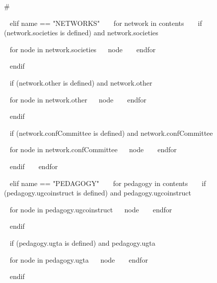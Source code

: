 \begin{minipage}{\textwidth}
{%
#}




~{ elif name == "NETWORKS" }~
~{ for network in contents }~
  ~{ if (network.societies is defined) and network.societies }~
  \begin{entrylist}[.1]
    ~{ for node in network.societies}~
     \networkentry
      {}
      {~{{ node }}~}
    ~{ endfor }~
  \end{entrylist}
  ~{ endif }~

  ~{ if (network.other is defined) and network.other }~
  \begin{entrylist}[.1]
    ~{ for node in network.other}~
     \networkentry
      {}
      {~{{ node }}~}
    ~{ endfor }~
  \end{entrylist}
  ~{ endif }~

  ~{ if (network.confCommittee is defined) and network.confCommittee }~
  \begin{entrylist}[.1]
    ~{ for node in network.confCommittee}~
     \networkentry
      {}
      {~{{ node }}~}
    ~{ endfor }~
  \end{entrylist}
  ~{ endif }~
~{ endfor }~



~{ elif name == "PEDAGOGY" }~
~{ for pedagogy in contents }~
  ~{ if (pedagogy.ugcoinstruct is defined) and pedagogy.ugcoinstruct }~
  \begin{entrylist}[.1]
    ~{ for node in pedagogy.ugcoinstruct}~
     \pedentry
      {~{{ node }}~}
    ~{ endfor }~
  \end{entrylist}
  ~{ endif }~

  ~{ if (pedagogy.ugta is defined) and pedagogy.ugta }~
  \begin{entrylist}[.1]
    ~{ for node in pedagogy.ugta}~
     \pedentry
      {~{{ node }}~}
    ~{ endfor }~
  \end{entrylist}
  ~{ endif }~


\end{minipage}
